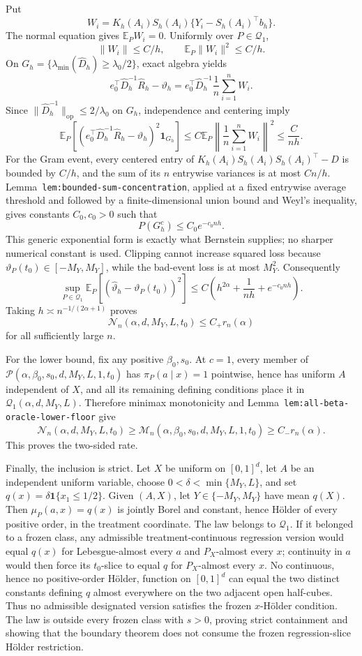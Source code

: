 Put
\[
W_i=K_h(A_i)S_h(A_i)\{Y_i-S_h(A_i)^\top b_h\}.
\]
The normal equation gives \(\mathbb E_PW_i=0\). Uniformly over \(P\in\mathcal Q_1\),
\[
\lVert W_i\rVert\le C/h,
\qquad
\mathbb E_P\lVert W_i\rVert^2\le C/h.
\]
On \(G_h=\{\lambda_{\min}(\widehat D_h)\ge\lambda_0/2\}\), exact algebra yields
\[
e_0^\top\widehat D_h^{-1}\widehat R_h-\vartheta_h
=
e_0^\top\widehat D_h^{-1}\frac1n\sum_{i=1}^nW_i.
\]
Since \(\lVert\widehat D_h^{-1}\rVert_{\mathrm{op}}\le2/\lambda_0\) on \(G_h\), independence and centering imply
\[
\mathbb E_P\left[
\left(e_0^\top\widehat D_h^{-1}\widehat R_h-\vartheta_h\right)^2
\mathbf 1_{G_h}
\right]
\le
C\mathbb E_P\left\lVert\frac1n\sum_{i=1}^nW_i\right\rVert^2
\le\frac{C}{nh}.
\]
For the Gram event, every centered entry of \(K_h(A_i)S_h(A_i)S_h(A_i)^\top-D\) is bounded by \(C/h\), and the sum of its \(n\) entrywise variances is at most \(Cn/h\). Lemma~\texttt{lem:bounded-sum-concentration}, applied at a fixed entrywise average threshold and followed by a finite-dimensional union bound and Weyl's inequality, gives constants \(C_0,c_0>0\) such that
\[
P(G_h^c)\le C_0e^{-c_0nh}.
\]
This generic exponential form is exactly what Bernstein supplies; no sharper numerical constant is used. Clipping cannot increase squared loss because \(\vartheta_P(t_0)\in[-M_Y,M_Y]\), while the bad-event loss is at most \(M_Y^2\). Consequently
\[
\sup_{P\in\mathcal Q_1}
\mathbb E_P[(\widehat\vartheta_h-\vartheta_P(t_0))^2]
\le
C\left(h^{2\alpha}+\frac1{nh}+e^{-c_0nh}\right).
\]
Taking \(h\asymp n^{-1/(2\alpha+1)}\) proves
\[
\mathcal N_n(\alpha,d,M_Y,L,t_0)
\le C_+r_n(\alpha)
\]
for all sufficiently large \(n\).

For the lower bound, fix any positive \(\beta_0,s_0\). At \(c=1\), every member of \(\mathcal P(\alpha,\beta_0,s_0,d,M_Y,L,1,t_0)\) has \(\pi_P(a\mid x)=1\) pointwise, hence has uniform \(A\) independent of \(X\), and all its remaining defining conditions place it in \(\mathcal Q_1(\alpha,d,M_Y,L)\). Therefore minimax monotonicity and Lemma~\texttt{lem:all-beta-oracle-lower-floor} give
\[
\mathcal N_n(\alpha,d,M_Y,L,t_0)
\ge
\mathcal M_n(\alpha,\beta_0,s_0,d,M_Y,L,1,t_0)
\ge C_-r_n(\alpha).
\]
This proves the two-sided rate.

Finally, the inclusion is strict. Let \(X\) be uniform on \([0,1]^d\), let \(A\) be an independent uniform variable, choose \(0<\delta<\min\{M_Y,L\}\), and set \(q(x)=\delta\mathbf 1\{x_1\le1/2\}\). Given \((A,X)\), let \(Y\in\{-M_Y,M_Y\}\) have mean \(q(X)\). Then \(\mu_P(a,x)=q(x)\) is jointly Borel and constant, hence H\"older of every positive order, in the treatment coordinate. The law belongs to \(\mathcal Q_1\). If it belonged to a frozen class, any admissible treatment-continuous regression version would equal \(q(x)\) for Lebesgue-almost every \(a\) and \(P_X\)-almost every \(x\); continuity in \(a\) would then force its \(t_0\)-slice to equal \(q\) for \(P_X\)-almost every \(x\). No continuous, hence no positive-order H\"older, function on \([0,1]^d\) can equal the two distinct constants defining \(q\) almost everywhere on the two adjacent open half-cubes. Thus no admissible designated version satisfies the frozen \(x\)-H\"older condition. The law is outside every frozen class with \(s>0\), proving strict containment and showing that the boundary theorem does not consume the frozen regression-slice H\"older restriction.